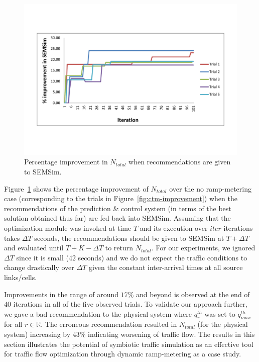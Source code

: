 \documentclass{wscpaperproc}
\theoremstyle{wsc}
\begin{document}
  \begin{figure}[!htbp]
      \centering
      \includegraphics[clip=true,trim=1.5cm 4.0cm 1.7cm 4.0cm,scale=0.32]{images/SEMSim-improvement.pdf}
              \caption{Percentage improvement in $N_{total}$ when recommendations are given to SEMSim. }
      \label{fig:semsim-improvement}
    \end{figure}

 Figure~\ref{fig:semsim-improvement} shows the percentage improvement of $N_{total}$ over the no ramp-metering case (corresponding to the trials in Figure~\ref{fig:ctm-improvement}) when the recommendations of the prediction \& control system (in terms of the best solution obtained thus far) are fed back into SEMSim. Assuming that the optimization module was invoked at time $T$ and its execution over $iter$ iterations takes $\Delta T$ seconds, the recommendations should be given to SEMSim at $T+\Delta T$ and evaluated until $T+K-\Delta T$ to return $N_{total}$. For our experiments, we ignored $\Delta T$ since it is small ($42$ seconds) and we do not expect the traffic conditions to change drastically over $\Delta T$ given the constant inter-arrival times at all source links/cells.  
 
 Improvements in the  range of around $17\%$ and beyond is observed at the end of $40$ iterations in all of the five observed trials. To validate our approach further, we gave a bad recommendation to the physical system where $q^{th}_r$ was set to $q^{th}_{max}$ for all $r\in \mathbb{R}$. The erroneous recommendation resulted in $N_{total}$ (for the physical system) increasing by $43\%$ indicating worsening of traffic flow. The results in this section  illustrates the potential of symbiotic traffic simulation as an effective tool for traffic flow optimization through dynamic ramp-metering as a case study.
\end{document}
